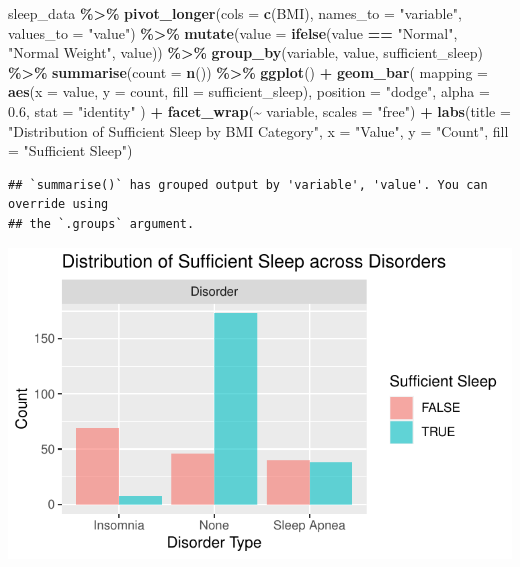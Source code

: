 \documentclass[
  11pt,
]{article}
\newenvironment{Shaded}{\begin{snugshade}}{\end{snugshade}}
\newcommand{\AttributeTok}[1]{\textcolor[rgb]{0.13,0.29,0.53}{#1}}
\newcommand{\FloatTok}[1]{\textcolor[rgb]{0.00,0.00,0.81}{#1}}
\newcommand{\FunctionTok}[1]{\textcolor[rgb]{0.13,0.29,0.53}{\textbf{#1}}}
\newcommand{\NormalTok}[1]{#1}
\newcommand{\SpecialCharTok}[1]{\textcolor[rgb]{0.81,0.36,0.00}{\textbf{#1}}}
\newcommand{\StringTok}[1]{\textcolor[rgb]{0.31,0.60,0.02}{#1}}
\begin{document}
\begin{Shaded}
\begin{Highlighting}[]
\NormalTok{sleep\_data }\SpecialCharTok{\%\textgreater{}\%}
  \FunctionTok{pivot\_longer}\NormalTok{(}\AttributeTok{cols =} \FunctionTok{c}\NormalTok{(BMI), }\AttributeTok{names\_to =} \StringTok{"variable"}\NormalTok{, }\AttributeTok{values\_to =} \StringTok{"value"}\NormalTok{) }\SpecialCharTok{\%\textgreater{}\%}
  \FunctionTok{mutate}\NormalTok{(}\AttributeTok{value =} \FunctionTok{ifelse}\NormalTok{(value }\SpecialCharTok{==} \StringTok{"Normal"}\NormalTok{, }\StringTok{"Normal Weight"}\NormalTok{, value)) }\SpecialCharTok{\%\textgreater{}\%}
  \FunctionTok{group\_by}\NormalTok{(variable, value, sufficient\_sleep) }\SpecialCharTok{\%\textgreater{}\%}
  \FunctionTok{summarise}\NormalTok{(}\AttributeTok{count =} \FunctionTok{n}\NormalTok{()) }\SpecialCharTok{\%\textgreater{}\%}
  \FunctionTok{ggplot}\NormalTok{() }\SpecialCharTok{+}
  \FunctionTok{geom\_bar}\NormalTok{(}
    \AttributeTok{mapping =} \FunctionTok{aes}\NormalTok{(}\AttributeTok{x =}\NormalTok{ value, }\AttributeTok{y =}\NormalTok{ count, }\AttributeTok{fill =}\NormalTok{ sufficient\_sleep),}
    \AttributeTok{position =} \StringTok{"dodge"}\NormalTok{,   }
    \AttributeTok{alpha =} \FloatTok{0.6}\NormalTok{,}
    \AttributeTok{stat =} \StringTok{"identity"}
\NormalTok{  ) }\SpecialCharTok{+}
  \FunctionTok{facet\_wrap}\NormalTok{(}\SpecialCharTok{\textasciitilde{}}\NormalTok{ variable, }\AttributeTok{scales =} \StringTok{"free"}\NormalTok{) }\SpecialCharTok{+}
  \FunctionTok{labs}\NormalTok{(}\AttributeTok{title =} \StringTok{"Distribution of Sufficient Sleep by BMI Category"}\NormalTok{,}
       \AttributeTok{x =} \StringTok{"Value"}\NormalTok{, }
       \AttributeTok{y =} \StringTok{"Count"}\NormalTok{, }
       \AttributeTok{fill =} \StringTok{"Sufficient Sleep"}\NormalTok{)}
\end{Highlighting}
\end{Shaded}

\begin{verbatim}
## `summarise()` has grouped output by 'variable', 'value'. You can override using
## the `.groups` argument.
\end{verbatim}

\begin{center}\includegraphics[width=0.7\linewidth]{SleepHelath_files/figure-latex/unnamed-chunk-42-1} \end{center}
\end{document}
